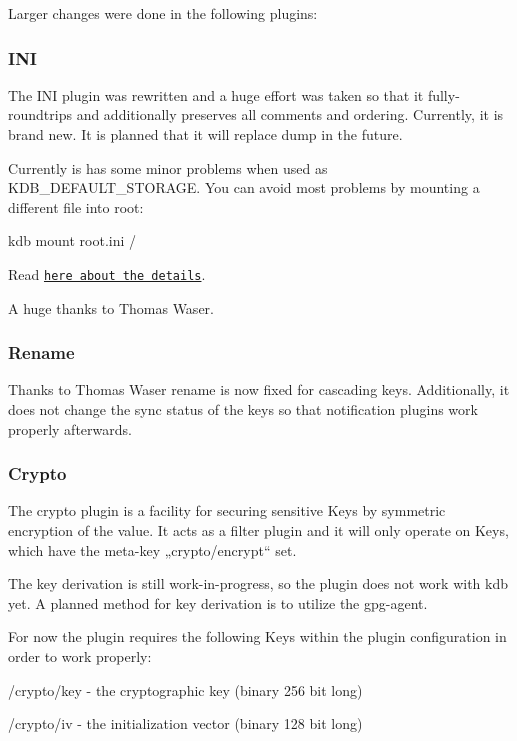 Larger changes were done in the following plugins\+:

\subsubsection*{I\+NI}

The I\+NI plugin was rewritten and a huge effort was taken so that it fully-\/roundtrips and additionally preserves all comments and ordering. Currently, it is brand new. It is planned that it will replace {\ttfamily dump} in the future.

Currently is has some minor problems when used as K\+D\+B\+\_\+\+D\+E\+F\+A\+U\+L\+T\+\_\+\+S\+T\+O\+R\+A\+GE. You can avoid most problems by mounting a different file into root\+: \begin{DoxyVerb}    kdb mount root.ini /
\end{DoxyVerb}


Read \href{https://github.com/ElektraInitiative/libelektra/tree/master/src/plugins/ini}{\tt here about the details}.

A huge thanks to Thomas Waser.

\subsubsection*{Rename}

Thanks to Thomas Waser {\ttfamily rename} is now fixed for cascading keys. Additionally, it does not change the {\ttfamily sync} status of the keys so that notification plugins work properly afterwards.

\subsubsection*{Crypto}

The crypto plugin is a facility for securing sensitive Keys by symmetric encryption of the value. It acts as a filter plugin and it will only operate on Keys, which have the meta-\/key „crypto/encrypt“ set.

The key derivation is still work-\/in-\/progress, so the plugin does not work with kdb yet. A planned method for key derivation is to utilize the gpg-\/agent.

For now the plugin requires the following Keys within the plugin configuration in order to work properly\+:


\begin{DoxyEnumerate}
\item /crypto/key -\/ the cryptographic key (binary 256 bit long)
\item /crypto/iv -\/ the initialization vector (binary 128 bit long)
\end{DoxyEnumerate}

